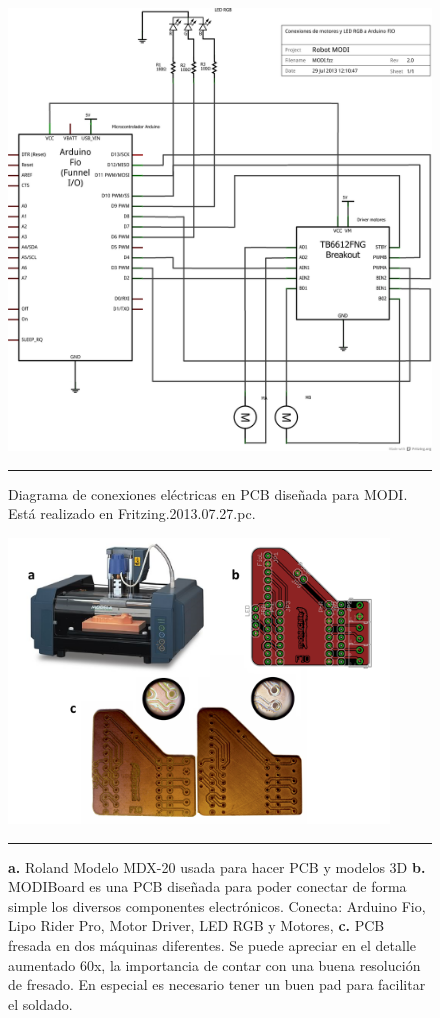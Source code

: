 \begin{figure}[htbp]
	\centering
		\includegraphics[width=\textwidth]{./Figures/modi/MODI_schem.png}
		\rule{35em}{0.5pt}
	\caption[Diagrama eléctrico de conexiones en PCB MODI]{Diagrama de conexiones eléctricas en PCB diseñada para MODI. Está realizado en Fritzing.2013.07.27.pc.}
	\label{fig:Diagrama cables}
\end{figure}	

\begin{figure}[htbp]
	\centering
		\includegraphics[width=0.9\textwidth]{./Figures/modi/pcb.png}
		\rule{35em}{0.5pt}
	\caption[Fabricación de PCB]{\textbf{a.} Roland Modelo MDX-20 usada para hacer PCB y modelos 3D \textbf{b.} MODIBoard es una PCB diseñada para poder conectar de forma simple los diversos componentes electrónicos. Conecta: Arduino Fio, Lipo Rider Pro, Motor Driver, LED RGB y Motores, \textbf{c. }PCB fresada en dos máquinas diferentes. Se puede apreciar en el detalle aumentado 60x, la importancia de contar con una buena resolución de fresado. En especial es necesario tener un buen pad para facilitar el soldado.}
	\label{fig:pcb}
\end{figure}


